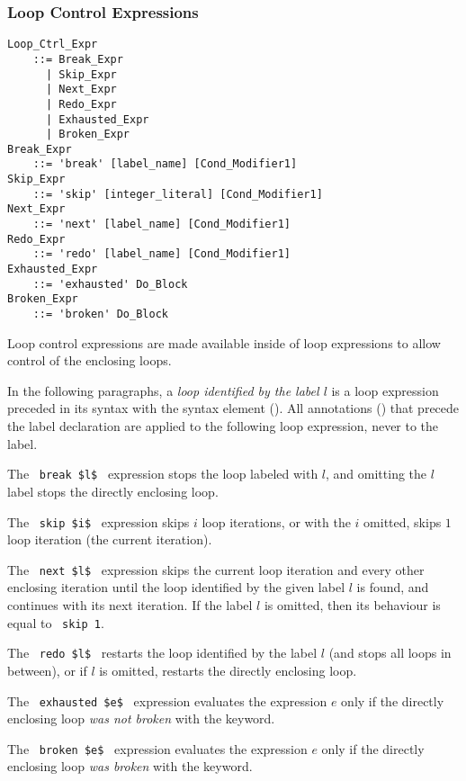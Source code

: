 \subsubsection{Loop Control Expressions}
\label{sec:loop-control-expressions}

\grammar\begin{lstlisting}
Loop_Ctrl_Expr 
    ::= Break_Expr
      | Skip_Expr
      | Next_Expr
      | Redo_Expr
      | Exhausted_Expr
      | Broken_Expr
Break_Expr 
    ::= 'break' [label_name] [Cond_Modifier1]
Skip_Expr
    ::= 'skip' [integer_literal] [Cond_Modifier1]
Next_Expr
    ::= 'next' [label_name] [Cond_Modifier1]
Redo_Expr 
    ::= 'redo' [label_name] [Cond_Modifier1]
Exhausted_Expr 
    ::= 'exhausted' Do_Block
Broken_Expr
    ::= 'broken' Do_Block
\end{lstlisting}

Loop control expressions are made available inside of loop expressions to allow control of the enclosing loops.

In the following paragraphs, a {\em loop identified by the label $l$} is a loop expression preceded in its syntax with the syntax element  (). All annotations () that precede the label declaration are applied to the following loop expression, never to the label. 

The ~\lstinline!break $l$!~ expression stops the loop labeled with $l$, and omitting the $l$ label stops the directly enclosing loop. 

The ~\lstinline!skip $i$!~ expression skips $i$ loop iterations, or with the $i$ omitted, skips $1$ loop iteration (the current iteration). 

The ~\lstinline!next $l$!~ expression skips the current loop iteration and every other enclosing iteration until the loop identified by the given label $l$ is found, and continues with its next iteration. If the label $l$ is omitted, then its behaviour is equal to ~\lstinline!skip 1!. 

The ~\lstinline!redo $l$!~ restarts the loop identified by the label $l$ (and stops all loops in between), or if $l$ is omitted, restarts the directly enclosing loop. 

The ~\lstinline!exhausted $e$!~ expression evaluates the expression $e$ only if the directly enclosing loop {\em was not broken} with the  keyword. 

The ~\lstinline!broken $e$!~ expression evaluates the expression $e$ only if the directly enclosing loop {\em was broken} with the  keyword. 

